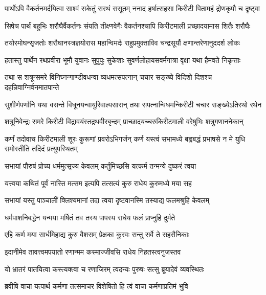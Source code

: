 \twolineshloka
{पार्थोऽपि वैकर्तनमर्दयित्वा साश्वं सकेतुं सरथं ससूतम्}
{ननाद हर्षात्सहसा किरीटी पितामहं द्रोणकृपौ च दृष्ट्वा}


\twolineshloka
{सिषेच पार्थं बहुभिः शरौघैर्वैकर्तनः संयति तीक्ष्णवेगैः}
{वैकर्तनश्चापि किरीटमाली प्रच्छादयामास शितैः शरौघैः}


\twolineshloka
{तयोरमोघन्सृजतोः शरौघानस्त्रज्ञयोरास महान्विमर्दः}
{राहुप्रमुक्ताविव चन्द्रसूर्यौ क्षणान्तरेणानुददर्श लोकः}


\twolineshloka
{हतास्तु पार्थेन रथप्रवीरा भूमौ युवानः सुपुपुः सुकेशाः}
{सुवर्णलोहायसवर्मगात्रा वृक्षा यथा हैमवते निकृत्ताः}


\twolineshloka
{तथा स शत्रून्समरे विनिघ्नन्गाण्डीवधन्वा व्यधमत्सपत्नान्}
{चचार सङ्ख्ये विदिशो दिशश्च दहन्निवाग्निर्वनमातपान्ते}


\twolineshloka
{सुशीर्णपर्णानि यथा वसन्ते विधूनयन्वायुरिवाल्पसारान्}
{तथा सपत्नान्विधमन्किरीटी चचार सङ्ख्येऽतिरथो रथेन}


\twolineshloka
{शत्रूनिवेन्द्रः समरे किरीटी विद्रावयंस्तद्रथवीरबृन्दम्}
{प्राच्छादयच्चरुकिरीटमाली वरेषुभिः शत्रुगणाननेकान्}


\onelineshloka
{कर्णं तदोवाच किरीटमाली शूरः कुरूणां प्रवरोऽभिगर्जन्}
\twolineshloka
{कर्ण यस्त्वं सभामध्ये बह्वबद्धं प्रभाषसे}
{न मे युधि समोस्तीति तदिदं प्रत्युपस्थितम्}


\twolineshloka
{सभायां पौरुषं प्रोच्य धर्ममुत्सृज्य केवलम्}
{कर्तुमिच्छसि यत्कर्म तन्मन्ये दुष्करं त्वया}



\twolineshloka
{यत्त्वया कथितं पूर्वं नास्ति मत्सम इत्यपि}
{तत्सत्यं कुरु राधेय कुरुमध्ये मया सह}


\twolineshloka
{सभायां यस्तु पाञ्चालीं क्लिश्यमानां तदा त्वया}
{दृष्टवानस्मि तस्याद्य फलमश्रुहि केवलम्}


\twolineshloka
{धर्मपाशनिबद्धेन यन्मया मर्षितं तव}
{तस्य पापस्य राधेय फलं प्राप्नुहि दुर्मते}


\twolineshloka
{एहि कर्ण मया सार्धमिहाद्य कुरु वैशसम्}
{प्रेक्षका कुरवः सन्तु सर्वे ते सहसैनिकाः}


\twolineshloka
{इदानीमेव तावत्त्वमपयातो रणान्मम}
{कस्माज्जीवसि राधेय निहतस्त्वनुजस्तव}


\twolineshloka
{यो भ्रातरं पातयित्वा कस्त्यक्त्वा च रणाजिरम्}
{त्वदन्यः पुरुषः सत्सु ब्रूयादेवं व्यवस्थितः}




\twolineshloka
{ब्रवीषि वाचा यत्पार्थ कर्मणा तत्समाचर}
{विशेषितो हि त्वं वाचा कर्मणाप्रतिमं भुवि}


